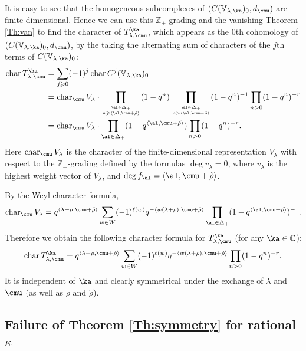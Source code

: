 \documentclass{amsart}
\newcommand{\bra}{{\langle}}
\newcommand{\ket}{{\rangle}}
\newcommand{\on}{\operatorname}
\newcommand{\+}{\mathop{\oplus}}
\renewcommand{\*}{{\otimes}}
\newcommand{\mb}{\mathbb}
\newcommand{\Z}{\mathbb{Z}}
\newcommand{\C}{\mathbb{C}}
\newcommand{\lam}{\lambda}
\def\geq{\geqslant}
\theoremstyle{theorem}
\theoremstyle{remark}
\numberwithin{equation}{section}
\begin{document}
It is easy to see that the homogeneous subcomplexes of $(C({\mb
  V}_{\lam,\ka})_0,d_\cmu)$ are finite-dimensional. Hence we can use
this $\Z_+$-grading and the vanishing Theorem \ref{Th:van} to find the
character of $T^\ka_{\lam,\cmu}$, which appears as the $0$th
cohomology of $(C({\mb V}_{\lam,\ka})_0,d_\cmu)$, by the taking the
alternating sum of characters of the $j$th terms of $C({\mb
  V}_{\lam,\ka})_0$:
\begin{align*}
\on{char} T^\ka_{\lam,\cmu} &= \sum_{j \geq 0} (-1)^j \on{char}
C^j({\mb V}_{\lam,\ka})_0 \\
&= \on{char}_\cmu V_\lam \cdot \prod_{\al \in \Delta_+\atop n\geq
  \bra\al,\cmu+\check\rho \ket} (1-q^n) \prod_{\al \in \Delta_+\atop n>
  \bra\al,\cmu+\check\rho \ket} (1-q^n)^{-1} \prod_{n>0} (1-q^n)^{-r}
\\
&= \on{char}_\cmu V_\lam \cdot \prod_{\al \in \Delta_+}
(1-q^{\bra\al,\cmu+\check\rho \ket}) \prod_{n>0} (1-q^n)^{-r}.
\end{align*}
Here $\on{char}_\cmu V_\lam$ is the character of the
finite-dimensional representation $V_\lam$ with respect to the
$\Z_+$-grading defined by the formulas $\on{deg} v_\lam = 0$, where
$v_\lam$ is the highest weight vector of $V_\lam$, and $\deg f_\al =
\bra\al,\cmu+\check\rho \ket$.

By the Weyl character formula,
$$
\on{char}_\cmu V_\lam = q^{\bra \lam+\rho,\cmu+\check\rho \ket}
\sum_{w \in W} (-1)^{\ell(w)} q^{-\bra w(\lam+\rho),\cmu+\check\rho \ket} 
\prod_{\al \in \Delta_+}
(1-q^{\bra\al,\cmu+\check\rho \ket})^{-1}.
$$
Therefore we obtain the following character formula for
$T^\ka_{\lam,\cmu}$ (for any $\ka \in \C$):
\begin{equation}    \label{char1}
\on{char} T^\ka_{\lam,\cmu} = q^{\bra \lam+\rho,\cmu+\check\rho \ket}
\sum_{w \in W} (-1)^{\ell(w)} q^{-\bra w(\lam+\rho),\cmu+\check\rho \ket}
\prod_{n>0} (1-q^n)^{-r}.
\end{equation}
It is independent of $\ka$ and clearly symmetrical under the exchange
of $\lam$ and $\cmu$ (as well as $\rho$ and $\check\rho$).

\subsection{Failure of Theorem \ref{Th:symmetry} for rational
  $\kappa$}    \label{fail}
\end{document}
